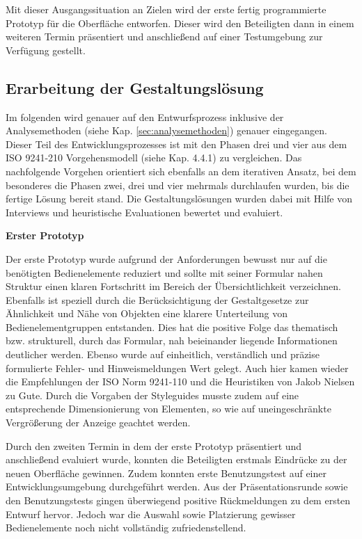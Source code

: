 Mit dieser Ausgangssituation an Zielen wird der erste fertig programmierte Prototyp für die Oberfläche entworfen. Dieser wird den Beteiligten dann in einem weiteren Termin präsentiert und anschließend auf einer Testumgebung zur Verfügung gestellt.


\subsection{Erarbeitung der Gestaltungslösung}
Im folgenden wird genauer auf den Entwurfsprozess inklusive der Analysemethoden (siehe Kap. \ref{sec:analysemethoden}) genauer eingegangen. Dieser Teil des Entwicklungsprozesses ist mit den Phasen drei und vier aus dem ISO 9241-210 Vorgehensmodell (siehe Kap. 4.4.1) zu vergleichen. Das nachfolgende Vorgehen orientiert sich ebenfalls an dem iterativen Ansatz, bei dem besonderes die Phasen zwei, drei und vier mehrmals durchlaufen wurden, bis die fertige Lösung bereit stand. Die Gestaltungslösungen wurden dabei mit Hilfe von Interviews und heuristische Evaluationen bewertet und evaluiert.

\textbf{Erster Prototyp}

Der erste Prototyp wurde aufgrund der Anforderungen bewusst nur auf die benötigten Bedienelemente reduziert und sollte mit seiner Formular nahen Struktur einen klaren Fortschritt im Bereich der Übersichtlichkeit verzeichnen. Ebenfalls ist speziell durch die Berücksichtigung der Gestaltgesetze zur Ähnlichkeit und Nähe von Objekten eine klarere Unterteilung von Bedienelementgruppen entstanden. Dies hat die positive Folge das thematisch bzw. strukturell, durch das Formular, nah beieinander liegende Informationen deutlicher werden. Ebenso wurde auf einheitlich, verständlich und präzise formulierte Fehler- und Hinweismeldungen Wert gelegt. Auch hier kamen wieder die Empfehlungen der ISO Norm 9241-110 und die Heuristiken von Jakob Nielsen zu Gute. Durch die Vorgaben der Styleguides musste zudem auf eine entsprechende Dimensionierung von Elementen, so wie auf uneingeschränkte Vergrößerung der Anzeige geachtet werden.

Durch den zweiten Termin in dem der erste Prototyp präsentiert und anschließend evaluiert wurde, konnten die Beteiligten erstmals Eindrücke zu der neuen Oberfläche gewinnen. Zudem konnten erste Benutzungstest auf einer Entwicklungsumgebung durchgeführt werden. Aus der Präsentationsrunde sowie den Benutzungstests gingen überwiegend positive Rückmeldungen zu dem ersten Entwurf hervor. Jedoch war die Auswahl sowie Platzierung gewisser Bedienelemente noch nicht vollständig zufriedenstellend. 

